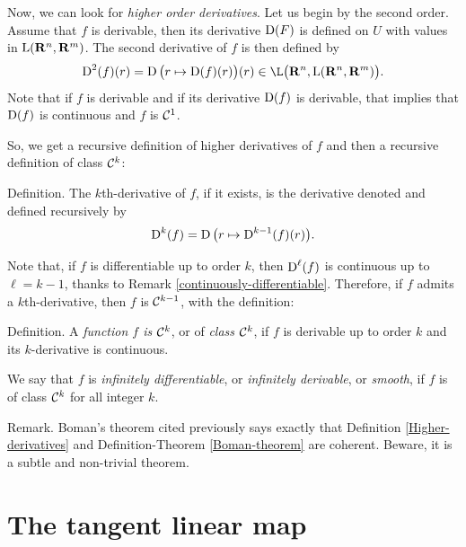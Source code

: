 Now,
we can look for \emph{higher order derivatives}.
Let us begin by the second order.
Assume that $f$ is derivable,
then its derivative $\operatorname{D}(F)$ is defined on $U$ with values in $\operatorname{L}(\mathbf{R}^n,\mathbf{R}^m)$.
The second derivative of $f$ is then defined by
$$%
  \Der^2(f)(r) = \Der\big(r \mapsto \Der(f)(r)\big)(r) \in \L\big(\RR^n, \Lin(\RR^n, \RR^m)\big).
  $$%
Note that if $f$ is derivable and if its derivative $\operatorname{D}(f)$ is derivable,
that implies that $\operatorname{D}(f)$ is continuous and $f$ is ${\mathcal{C}}^{1}$.

So,
we get a recursive definition of higher derivatives of $f$ and then a recursive definition of class ${\mathcal{C}}^{k}$:

\begin{Article}{Definition.}{\itshape}\label{Higher-derivatives}
  The $k$th-derivative of $f$,
  if it exists,
  is the derivative denoted and defined recursively by
  $$%
    \Der^k(f) = \Der\big(r \mapsto \Der^{k-1}(f)(r)\big).
    $$%
\end{Article}
%
Note that,
if $f$ is differentiable up to order $k$,
then $\operatorname{D}^{\ell}(f)$ is continuous up to $\ell = k-1$,
thanks to Remark \ref{continuously-differentiable}.
Therefore,
if $f$ admits a $k$th-derivative,
then $f$ is ${\mathcal{C}}^{k-1}$,
with the definition:

\begin{Article}{Definition.}{\itshape}
  A \emph{function $f$ is ${\mathcal{C}}^{k}$},
  or of \emph{class ${\mathcal{C}}^{k}$},
  if $f$ is derivable up to order $k$ and its $k$-derivative is continuous.
  
  We say that $f$ is \emph{infinitely differentiable},
  or \emph{infinitely derivable},
  or \emph{smooth},
  if $f$ is of class ${\mathcal{C}}^{k}$ for all integer $k$.
\end{Article}

\begin{Article}{Remark.}{}
  Boman's theorem cited previously says exactly that Definition \ref{Higher-derivatives} and Definition-Theorem \ref{Boman-theorem} are coherent.
  Beware,
  it is a subtle and non-trivial theorem.
\end{Article}


\section{The tangent linear map}

